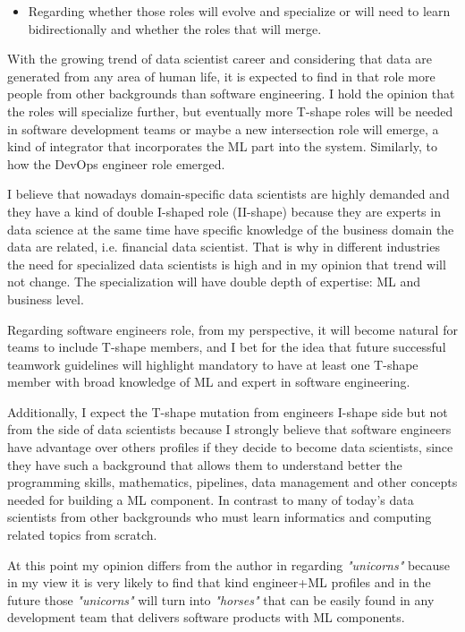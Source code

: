 \documentclass[11pt,a4paper]{article}
\begin{document}
\begin{itemize}
    \item Regarding whether those roles will evolve and specialize or will need to learn bidirectionally and whether the roles that will merge.
\end{itemize}

With the growing trend of data scientist career and considering that data are generated from any area of human life, it is expected to find in that role more people from other backgrounds than software engineering. I hold the opinion that the roles will specialize further, but eventually more T-shape roles will be needed in software development teams or maybe a new intersection role will emerge, a kind of integrator that incorporates the ML part into the system. Similarly, to how the DevOps engineer role emerged. 

I believe that nowadays domain-specific data scientists are highly demanded and they have a kind of double I-shaped role (II-shape) because they are experts in data science at the same time have specific knowledge of the business domain the data are related, i.e. financial data scientist. That is why in different industries the need for specialized data scientists is high and in my opinion that trend will not change. The specialization will have double depth of expertise: ML and business level. 

Regarding software engineers role, from my perspective, it will become natural for teams to include T-shape members, and I bet for the idea that future successful teamwork guidelines will highlight mandatory to have at least one T-shape member with broad knowledge of ML and expert in software engineering. 

Additionally, I expect the T-shape mutation from engineers I-shape side but not from the side of data scientists because I strongly believe that software engineers have advantage over others profiles if they decide to become data scientists, since they have such a background that allows them to understand better the programming skills, mathematics, pipelines, data management and other concepts needed for building a ML component. In contrast to many of today's data scientists from other backgrounds who must learn informatics and computing related topics from scratch. 

At this point my opinion differs from the author in \cite{K:25} regarding \textit{"unicorns"} because in my view it is very likely to find that kind engineer+ML profiles and in the future those \textit{"unicorns"} will turn into \textit{"horses"} that can be easily found in any development team that delivers software products with ML components. 
\end{document}
